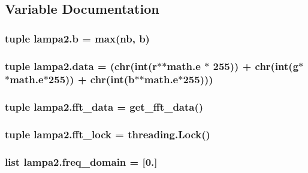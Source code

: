 \subsection{Variable Documentation}
\hypertarget{namespacelampa2_ad18fb2a0ddf9deb37654aa331d93b942}{}
\subsubsection[{b}]{\setlength{\rightskip}{0pt plus 5cm}tuple lampa2.\+b = max({\bf nb}, b)}\label{namespacelampa2_ad18fb2a0ddf9deb37654aa331d93b942}
\hypertarget{namespacelampa2_a8c1b8cd83e7f9e09b3ce038d2bb48978}{}
\subsubsection[{data}]{\setlength{\rightskip}{0pt plus 5cm}tuple lampa2.\+data = (chr(int({\bf r}$\ast$$\ast$math.\+e $\ast$ 255)) + chr(int({\bf g}$\ast$$\ast$math.\+e$\ast$255)) + chr(int({\bf b}$\ast$$\ast$math.\+e$\ast$255)))}\label{namespacelampa2_a8c1b8cd83e7f9e09b3ce038d2bb48978}
\hypertarget{namespacelampa2_af0327ebf49f7e611e30336ab1506369a}{}
\subsubsection[{fft\+\_\+data}]{\setlength{\rightskip}{0pt plus 5cm}tuple lampa2.\+fft\+\_\+data = {\bf get\+\_\+fft\+\_\+data}()}\label{namespacelampa2_af0327ebf49f7e611e30336ab1506369a}
\hypertarget{namespacelampa2_af190776ce002434d902e9fa656949eae}{}
\subsubsection[{fft\+\_\+lock}]{\setlength{\rightskip}{0pt plus 5cm}tuple lampa2.\+fft\+\_\+lock = threading.\+Lock()}\label{namespacelampa2_af190776ce002434d902e9fa656949eae}
\hypertarget{namespacelampa2_af51ab190cd522ff9a865cb7398734215}{}
\subsubsection[{freq\+\_\+domain}]{\setlength{\rightskip}{0pt plus 5cm}list lampa2.\+freq\+\_\+domain = \mbox{[}0.\mbox{]}}\label{namespacelampa2_af51ab190cd522ff9a865cb7398734215}
\hypertarget{namespacelampa2_a9bb8fdc41ec8a48e18b36891175c745d}{}
